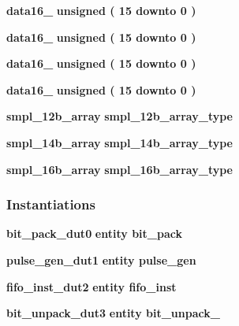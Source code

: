 \begin{DoxyCompactItemize}
\item 
{\bf data16\+\_} {\bfseries \textcolor{comment}{unsigned}\textcolor{vhdlchar}{ }\textcolor{vhdlchar}{(}\textcolor{vhdlchar}{ }\textcolor{vhdlchar}{ } \textcolor{vhdldigit}{15} \textcolor{vhdlchar}{ }\textcolor{keywordflow}{downto}\textcolor{vhdlchar}{ }\textcolor{vhdlchar}{ } \textcolor{vhdldigit}{0} \textcolor{vhdlchar}{ }\textcolor{vhdlchar}{)}\textcolor{vhdlchar}{ }} 
\item 
{\bf data16\+\_} {\bfseries \textcolor{comment}{unsigned}\textcolor{vhdlchar}{ }\textcolor{vhdlchar}{(}\textcolor{vhdlchar}{ }\textcolor{vhdlchar}{ } \textcolor{vhdldigit}{15} \textcolor{vhdlchar}{ }\textcolor{keywordflow}{downto}\textcolor{vhdlchar}{ }\textcolor{vhdlchar}{ } \textcolor{vhdldigit}{0} \textcolor{vhdlchar}{ }\textcolor{vhdlchar}{)}\textcolor{vhdlchar}{ }} 
\item 
{\bf data16\+\_} {\bfseries \textcolor{comment}{unsigned}\textcolor{vhdlchar}{ }\textcolor{vhdlchar}{(}\textcolor{vhdlchar}{ }\textcolor{vhdlchar}{ } \textcolor{vhdldigit}{15} \textcolor{vhdlchar}{ }\textcolor{keywordflow}{downto}\textcolor{vhdlchar}{ }\textcolor{vhdlchar}{ } \textcolor{vhdldigit}{0} \textcolor{vhdlchar}{ }\textcolor{vhdlchar}{)}\textcolor{vhdlchar}{ }} 
\item 
{\bf data16\+\_} {\bfseries \textcolor{comment}{unsigned}\textcolor{vhdlchar}{ }\textcolor{vhdlchar}{(}\textcolor{vhdlchar}{ }\textcolor{vhdlchar}{ } \textcolor{vhdldigit}{15} \textcolor{vhdlchar}{ }\textcolor{keywordflow}{downto}\textcolor{vhdlchar}{ }\textcolor{vhdlchar}{ } \textcolor{vhdldigit}{0} \textcolor{vhdlchar}{ }\textcolor{vhdlchar}{)}\textcolor{vhdlchar}{ }} 
\item 
{\bf smpl\+\_\+12b\+\_\+array} {\bfseries {\bfseries {\bf smpl\+\_\+12b\+\_\+array\+\_\+type}} \textcolor{vhdlchar}{ }} 
\item 
{\bf smpl\+\_\+14b\+\_\+array} {\bfseries {\bfseries {\bf smpl\+\_\+14b\+\_\+array\+\_\+type}} \textcolor{vhdlchar}{ }} 
\item 
{\bf smpl\+\_\+16b\+\_\+array} {\bfseries {\bfseries {\bf smpl\+\_\+16b\+\_\+array\+\_\+type}} \textcolor{vhdlchar}{ }} 
\end{DoxyCompactItemize}
\subsubsection*{Instantiations}
 \begin{DoxyCompactItemize}
\item 
{\bf bit\+\_\+pack\+\_\+dut0}  {\bfseries entity bit\+\_\+pack}   
\item 
{\bf pulse\+\_\+gen\+\_\+dut1}  {\bfseries entity pulse\+\_\+gen}   
\item 
{\bf fifo\+\_\+inst\+\_\+dut2}  {\bfseries entity fifo\+\_\+inst}   
\item 
{\bf bit\+\_\+unpack\+\_\+dut3}  {\bfseries entity bit\+\_\+unpack\+\_}   
\end{DoxyCompactItemize}


